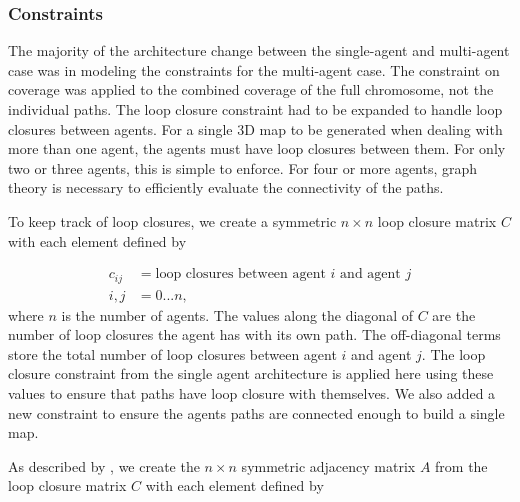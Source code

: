 \documentclass[letterpaper, 10 pt, conference]{ieeeconf}  %
\begin{document}
%

\subsubsection{Constraints}
The majority of the architecture change between the single-agent and multi-agent case was in modeling the constraints for the multi-agent case. The constraint on coverage was applied to the combined coverage of the full chromosome, not the individual paths. The loop closure constraint had to be expanded to handle loop closures between agents. For a single 3D map to be generated when dealing with more than one agent, the agents must have loop closures between them. For only two or three agents, this is simple to enforce. For four or more agents, graph theory is necessary to efficiently evaluate the connectivity of the paths.

To keep track of loop closures, we create a symmetric $n \times n$ loop closure matrix $C$ with each element defined by

\begin{align}
  c_{ij} &= \text{loop closures between agent } i \text{ and agent } j \\
  i,j &= 0...n \text{,}\nonumber
\end{align}
%
where $n$ is the number of agents. The values along the diagonal of $C$ are the number of loop closures the agent has with its own path. The off-diagonal terms store the total number of loop closures between agent $i$ and agent $j$. The loop closure constraint from the single agent architecture is applied here using these values to ensure that paths have loop closure with themselves. We also added a new constraint to ensure the agents paths are connected enough to build a single map.

As described by \cite{Weisstein}, we create the $n \times n$ symmetric adjacency matrix $A$ from the loop closure matrix $C$ with each element defined by
\end{document}
